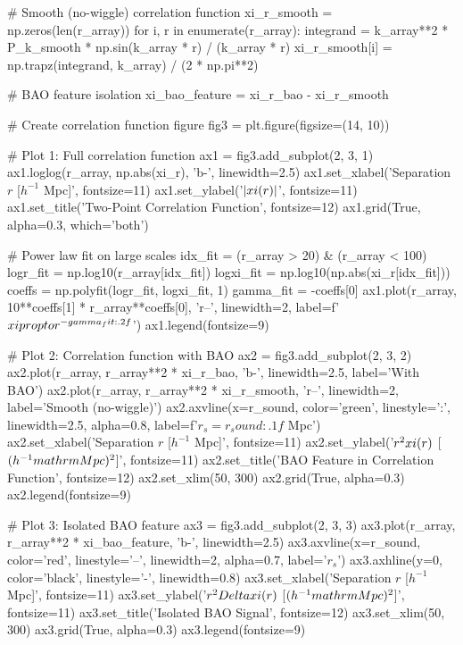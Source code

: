 \documentclass[a4paper, 11pt]{article}
\begin{document}
\begin{pycode}
# Smooth (no-wiggle) correlation function
xi_r_smooth = np.zeros(len(r_array))
for i, r in enumerate(r_array):
    integrand = k_array**2 * P_k_smooth * np.sin(k_array * r) / (k_array * r)
    xi_r_smooth[i] = np.trapz(integrand, k_array) / (2 * np.pi**2)

# BAO feature isolation
xi_bao_feature = xi_r_bao - xi_r_smooth

# Create correlation function figure
fig3 = plt.figure(figsize=(14, 10))

# Plot 1: Full correlation function
ax1 = fig3.add_subplot(2, 3, 1)
ax1.loglog(r_array, np.abs(xi_r), 'b-', linewidth=2.5)
ax1.set_xlabel('Separation $r$ [$h^{-1}$ Mpc]', fontsize=11)
ax1.set_ylabel('$|\\xi(r)|$', fontsize=11)
ax1.set_title('Two-Point Correlation Function', fontsize=12)
ax1.grid(True, alpha=0.3, which='both')

# Power law fit on large scales
idx_fit = (r_array > 20) & (r_array < 100)
logr_fit = np.log10(r_array[idx_fit])
logxi_fit = np.log10(np.abs(xi_r[idx_fit]))
coeffs = np.polyfit(logr_fit, logxi_fit, 1)
gamma_fit = -coeffs[0]
ax1.plot(r_array, 10**coeffs[1] * r_array**coeffs[0], 'r--', linewidth=2,
         label=f'$\\xi \\propto r^{{-{gamma_fit:.2f}}}$')
ax1.legend(fontsize=9)

# Plot 2: Correlation function with BAO
ax2 = fig3.add_subplot(2, 3, 2)
ax2.plot(r_array, r_array**2 * xi_r_bao, 'b-', linewidth=2.5, label='With BAO')
ax2.plot(r_array, r_array**2 * xi_r_smooth, 'r--', linewidth=2, label='Smooth (no-wiggle)')
ax2.axvline(x=r_sound, color='green', linestyle=':', linewidth=2.5, alpha=0.8, label=f'$r_s = {r_sound:.1f}$ Mpc')
ax2.set_xlabel('Separation $r$ [$h^{-1}$ Mpc]', fontsize=11)
ax2.set_ylabel('$r^2 \\xi(r)$ [$(h^{-1}\\mathrm{Mpc})^2$]', fontsize=11)
ax2.set_title('BAO Feature in Correlation Function', fontsize=12)
ax2.set_xlim(50, 300)
ax2.grid(True, alpha=0.3)
ax2.legend(fontsize=9)

# Plot 3: Isolated BAO feature
ax3 = fig3.add_subplot(2, 3, 3)
ax3.plot(r_array, r_array**2 * xi_bao_feature, 'b-', linewidth=2.5)
ax3.axvline(x=r_sound, color='red', linestyle='--', linewidth=2, alpha=0.7, label='$r_s$')
ax3.axhline(y=0, color='black', linestyle='-', linewidth=0.8)
ax3.set_xlabel('Separation $r$ [$h^{-1}$ Mpc]', fontsize=11)
ax3.set_ylabel('$r^2 \\Delta\\xi(r)$ [$(h^{-1}\\mathrm{Mpc})^2$]', fontsize=11)
ax3.set_title('Isolated BAO Signal', fontsize=12)
ax3.set_xlim(50, 300)
ax3.grid(True, alpha=0.3)
ax3.legend(fontsize=9)


\end{pycode}
\end{document}
